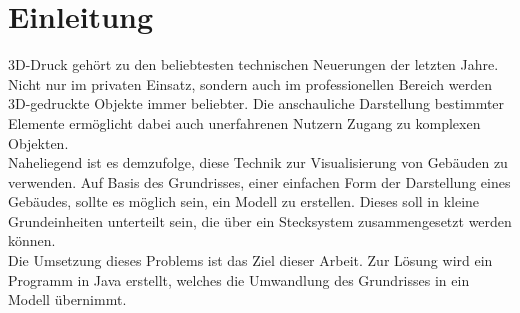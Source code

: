 \chapter{Einleitung}
3D-Druck gehört zu den beliebtesten technischen Neuerungen der letzten Jahre.
Nicht nur im privaten Einsatz, sondern auch im professionellen Bereich werden 3D-gedruckte Objekte immer beliebter.
Die anschauliche Darstellung bestimmter Elemente ermöglicht dabei auch unerfahrenen Nutzern Zugang zu komplexen Objekten. \\

Naheliegend ist es demzufolge, diese Technik zur Visualisierung von Gebäuden zu verwenden.
Auf Basis des Grundrisses, einer einfachen Form der Darstellung eines Gebäudes, sollte es möglich sein, ein Modell zu erstellen.
Dieses soll in kleine Grundeinheiten unterteilt sein, die über ein Stecksystem zusammengesetzt werden können. \\

Die Umsetzung dieses Problems ist das Ziel dieser Arbeit.
Zur Lösung wird ein Programm in Java erstellt, welches die Umwandlung des Grundrisses in ein Modell übernimmt.

%
%
%
